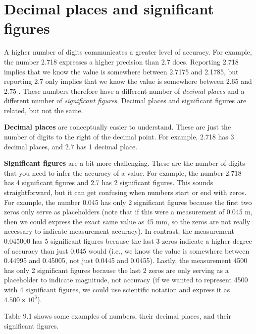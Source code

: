 \documentclass[
  openany]{krantz}
\begin{document}
\hypertarget{decimal-places-and-significant-figures}{%
\section{Decimal places and significant figures}\label{decimal-places-and-significant-figures}}

A higher number of digits communicates a greater level of accuracy.
For example, the number 2.718 expresses a higher precision than 2.7 does.
Reporting 2.718 implies that we know the value is somewhere between 2.7175 and 2.1785, but reporting 2.7 only implies that we know the value is somewhere between 2.65 and 2.75 \citep{Sokal1995}.
These numbers therefore have a different number of \emph{decimal places} and a different number of \emph{significant figures}.
Decimal places and significant figures are related, but not the same.

\textbf{Decimal places} are conceptually easier to understand. These are just the number of digits to the right of the decimal point. For example, 2.718 has 3 decimal places, and 2.7 has 1 decimal place.

\textbf{Significant figures} are a bit more challenging.
These are the number of digits that you need to infer the accuracy of a value.
For example, the number 2.718 has 4 significant figures and 2.7 has 2 significant figures. This sounds straightforward, but it can get confusing when numbers start or end with zeros.
For example, the number 0.045 has only 2 significant figures because the first two zeros only serve as placeholders (note that if this were a measurement of 0.045 m, then we could express the exact same value as 45 mm, so the zeros are not really necessary to indicate measurement accuracy).
In contrast, the measurement 0.045000 has 5 significant figures because the last 3 zeros indicate a higher degree of accuracy than just 0.045 would (i.e., we know the value is somewhere between 0.44995 and 0.45005, not just 0.0445 and 0.0455).
Lastly, the measurement 4500 has only 2 significant figures because the last 2 zeros are only serving as a placeholder to indicate magnitude, not accuracy (if we wanted to represent 4500 with 4 significant figures, we could use scientific notation and express it as \(4.500 \times 10^3\)).

Table 9.1 shows some examples of numbers, their decimal places, and their significant figures.
\end{document}
